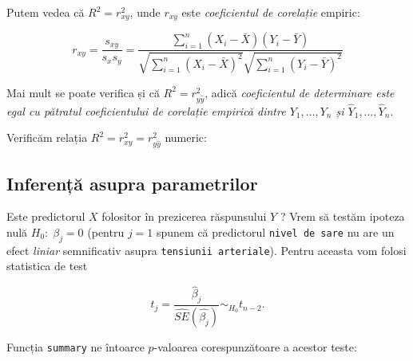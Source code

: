 \documentclass[]{article}
\newenvironment{Shaded}{\begin{snugshade}}{\end{snugshade}}
\newcommand{\KeywordTok}[1]{\textcolor[rgb]{0.13,0.29,0.53}{\textbf{#1}}}
\newcommand{\DecValTok}[1]{\textcolor[rgb]{0.00,0.00,0.81}{#1}}
\newcommand{\FloatTok}[1]{\textcolor[rgb]{0.00,0.00,0.81}{#1}}
\newcommand{\StringTok}[1]{\textcolor[rgb]{0.31,0.60,0.02}{#1}}
\newcommand{\CommentTok}[1]{\textcolor[rgb]{0.56,0.35,0.01}{\textit{#1}}}
\newcommand{\OperatorTok}[1]{\textcolor[rgb]{0.81,0.36,0.00}{\textbf{#1}}}
\newcommand{\NormalTok}[1]{#1}
\begin{document}
Putem vedea că \(R^2=r_{xy}^2\), unde \(r_{xy}\) este \emph{coeficientul
de corelație} empiric:

\[
r_{xy}=\frac{s_{xy}}{s_xs_y}=\frac{\sum_{i=1}^n \left(X_i-\bar X \right)\left(Y_i-\bar Y \right)}{\sqrt{\sum_{i=1}^n \left(X_i-\bar X \right)^2}\sqrt{\sum_{i=1}^n \left(Y_i-\bar Y \right)^2}}
\]

Mai mult se poate verifica și că \(R^2=r^2_{y\hat y}\), adică
\emph{coeficientul de determinare este egal cu pătratul coeficientului
de corelație empirică dintre \(Y_1,\ldots,Y_n\) și
\(\hat Y_1,\ldots,\hat Y_n\)}.

Verificăm relația \(R^2=r^2_{xy}=r^2_{y\hat y}\) numeric:

\begin{Shaded}
\end{Shaded}

\subsection{Inferență asupra
parametrilor}\label{inferenta-asupra-parametrilor}

Este predictorul \(X\) folositor în prezicerea răspunsului \(Y\) ? Vrem
să testăm ipoteza nulă \(H_0:\;\beta_j=0\) (pentru \(j=1\) spunem că
predictorul \texttt{nivel\ de\ sare} nu are un efect \emph{liniar}
semnificativ asupra \texttt{tensiunii\ arteriale}). Pentru aceasta vom
folosi statistica de test

\[
t_j = \frac{\hat{\beta}_j}{\hat{SE}(\hat{\beta_j})}\sim_{H_0} t_{n-2}.
\]

Funcția \texttt{summary} ne întoarce \(p\)-valoarea corespunzătoare a
acestor teste:
\end{document}
